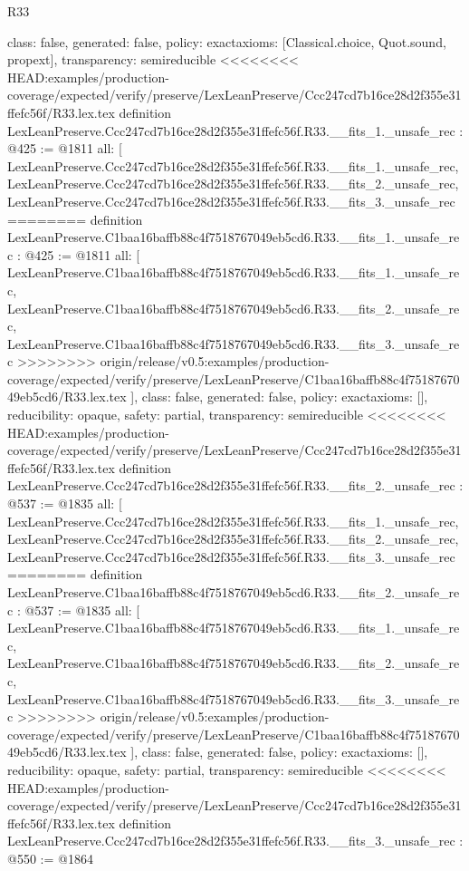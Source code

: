 \begin{lexlean}{R33}
\begin{coremodule}
{{{{{{{{{{{{{{{  class: false,
  generated: false,
  policy: exact{axioms: [Classical.choice, Quot.sound, propext]},
  transparency: semireducible
}
<<<<<<<< HEAD:examples/production-coverage/expected/verify/preserve/LexLeanPreserve/Ccc247cd7b16ce28d2f355e31ffefc56f/R33.lex.tex
definition LexLeanPreserve.Ccc247cd7b16ce28d2f355e31ffefc56f.R33.__fits_1._unsafe_rec : @425 := @1811 {
  all: [
    LexLeanPreserve.Ccc247cd7b16ce28d2f355e31ffefc56f.R33.__fits_1._unsafe_rec,
    LexLeanPreserve.Ccc247cd7b16ce28d2f355e31ffefc56f.R33.__fits_2._unsafe_rec,
    LexLeanPreserve.Ccc247cd7b16ce28d2f355e31ffefc56f.R33.__fits_3._unsafe_rec
========
definition LexLeanPreserve.C1baa16baffb88c4f7518767049eb5cd6.R33.__fits_1._unsafe_rec : @425 := @1811 {
  all: [
    LexLeanPreserve.C1baa16baffb88c4f7518767049eb5cd6.R33.__fits_1._unsafe_rec,
    LexLeanPreserve.C1baa16baffb88c4f7518767049eb5cd6.R33.__fits_2._unsafe_rec,
    LexLeanPreserve.C1baa16baffb88c4f7518767049eb5cd6.R33.__fits_3._unsafe_rec
>>>>>>>> origin/release/v0.5:examples/production-coverage/expected/verify/preserve/LexLeanPreserve/C1baa16baffb88c4f7518767049eb5cd6/R33.lex.tex
  ],
  class: false,
  generated: false,
  policy: exact{axioms: []},
  reducibility: opaque{},
  safety: partial,
  transparency: semireducible
}
<<<<<<<< HEAD:examples/production-coverage/expected/verify/preserve/LexLeanPreserve/Ccc247cd7b16ce28d2f355e31ffefc56f/R33.lex.tex
definition LexLeanPreserve.Ccc247cd7b16ce28d2f355e31ffefc56f.R33.__fits_2._unsafe_rec : @537 := @1835 {
  all: [
    LexLeanPreserve.Ccc247cd7b16ce28d2f355e31ffefc56f.R33.__fits_1._unsafe_rec,
    LexLeanPreserve.Ccc247cd7b16ce28d2f355e31ffefc56f.R33.__fits_2._unsafe_rec,
    LexLeanPreserve.Ccc247cd7b16ce28d2f355e31ffefc56f.R33.__fits_3._unsafe_rec
========
definition LexLeanPreserve.C1baa16baffb88c4f7518767049eb5cd6.R33.__fits_2._unsafe_rec : @537 := @1835 {
  all: [
    LexLeanPreserve.C1baa16baffb88c4f7518767049eb5cd6.R33.__fits_1._unsafe_rec,
    LexLeanPreserve.C1baa16baffb88c4f7518767049eb5cd6.R33.__fits_2._unsafe_rec,
    LexLeanPreserve.C1baa16baffb88c4f7518767049eb5cd6.R33.__fits_3._unsafe_rec
>>>>>>>> origin/release/v0.5:examples/production-coverage/expected/verify/preserve/LexLeanPreserve/C1baa16baffb88c4f7518767049eb5cd6/R33.lex.tex
  ],
  class: false,
  generated: false,
  policy: exact{axioms: []},
  reducibility: opaque{},
  safety: partial,
  transparency: semireducible
}
<<<<<<<< HEAD:examples/production-coverage/expected/verify/preserve/LexLeanPreserve/Ccc247cd7b16ce28d2f355e31ffefc56f/R33.lex.tex
definition LexLeanPreserve.Ccc247cd7b16ce28d2f355e31ffefc56f.R33.__fits_3._unsafe_rec : @550 := @1864 {
}}}}}}}}}}}}}}}}}
\end{coremodule}
\end{lexlean}
